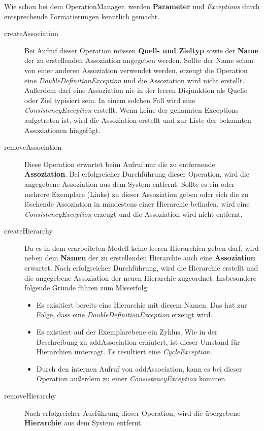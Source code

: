Wie schon bei dem OperationManager, werden \textbf{Parameter} und \emph{Exceptions} durch entsprechende Formatierungen kenntlich gemacht.

\begin{description}
\item[createAssociation] Bei Aufruf dieser Operation müssen \textbf{Quell- und Zieltyp} sowie der \textbf{Name} der zu erstellenden Assoziation 
angegeben werden.
Sollte der Name schon von einer anderen Assoziation verwendet werden, erzeugt die Operation eine \emph{DoubleDefinitionException} und die Assoziation wird nicht
erstellt. Außerdem darf eine Assoziation nie in der leeren Disjunktion als Quelle oder Ziel typisiert sein. In einem solchen Fall
wird eine \emph{ConsistencyException} erstellt.
Wenn keine der genannten Exceptions aufgetreten ist, wird die Assoziation erstellt und zur Liste der bekannten Assoziationen hingefügt. 
\item[removeAssociation] Diese Operation erwartet beim Aufruf nur die zu entfernende \textbf{Assoziation}. 
Bei erfolgreicher Durchführung dieser Operation, wird die
angegebene Assoziation aus dem System entfernt.
Sollte es ein oder mehrere Exemplare (Links) zu dieser Assoziation geben oder sich die zu löschende Assoziation in mindestens einer Hierarchie befinden, wird eine \emph{ConsistencyException} erzeugt und die Assoziation wird nicht entfernt. 
\item[createHierarchy] Da es in dem erarbeiteten Modell keine leeren Hierarchien geben darf, wird neben dem \textbf{Namen} der zu erstellenden Hierarchie auch eine 
\textbf{Assoziation} erwartet. Nach erfolgreicher Durchführung, wird die Hierarchie erstellt und die angegebene Assoziation der neuen Hierarchie zugeordnet.
Insbesondere folgende Gründe führen zum Misserfolg:
\begin{itemize}
\item Es exisitiert bereits eine Hierarchie mit diesem Namen. Das hat zur Folge, dass eine \emph{DoubleDefinitionException} erzeugt wird.
\item Es existiert auf der Exemplarebene ein Zyklus. Wie in der Beschreibung zu addAssociation erläutert, ist dieser Umstand für Hierarchien untersagt.
 Es resultiert eine \emph{CycleException.}
 \item Durch den internen Aufruf von addAssociation, kann es bei dieser Operation außerdem zu einer \emph{ConsistencyException} kommen.
\end{itemize}
\item[removeHierarchy] Nach erfolgreicher Ausführung dieser Operation, wird die übergebene \textbf{Hierarchie} aus dem System entfernt. 

\end{description}
